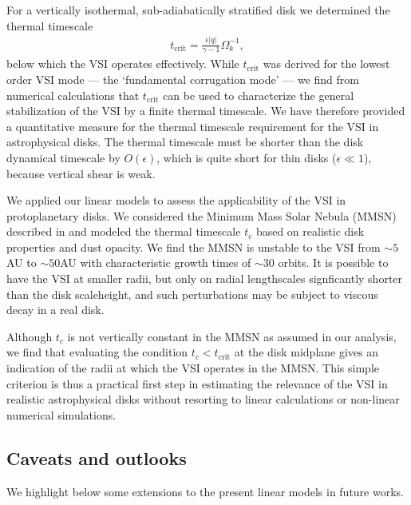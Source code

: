 For a vertically isothermal, sub-adiabatically stratified disk we
determined the thermal timescale   
\begin{align*}
  t_\mathrm{crit} = \frac{\epsilon |q|}{\gamma-1}\Omega_k^{-1}, 
\end{align*}
below which the VSI operates effectively. While $t_\mathrm{crit}$ was
derived for the lowest order VSI mode --- the `fundamental  
corrugation mode' --- we find from numerical calculations that
$t_\mathrm{crit}$ can be used to characterize the general
stabilization of the VSI by a finite thermal timescale. %
We have therefore provided a quantitative measure for the thermal
timescale requirement for the VSI in astrophysical 
disks. The thermal timescale must be shorter than the disk
dynamical timescale by $O(\epsilon)$, which is
quite short for thin disks ($\epsilon\ll 1$), because vertical shear is weak.    

We applied our linear models to assess the applicability of the VSI in
protoplanetary disks. We considered the Minimum Mass Solar Nebula 
(MMSN) described in \cite{chiang10} and   
modeled the thermal timescale $t_c$ based on realistic
disk properties and dust opacity. 
We find the MMSN is unstable to the VSI 
from $\sim 5$AU to $\sim50$AU with characteristic growth times of
$\sim 30$ orbits. It is possible to have the VSI at smaller
radii, but only on radial lengthscales signficantly shorter
than the disk scaleheight, and such perturbations may
be subject to viscous decay in a real disk.   

Although $t_c$ is not vertically constant in the 
MMSN as assumed in our analysis, we find that evaluating the condition
$t_c< t_\mathrm{crit}$ at the disk midplane gives an indication of the
radii at which the VSI operates in the MMSN. This simple criterion is
thus a practical first step in estimating the relevance of the VSI in
realistic astrophysical disks without resorting to linear
calculations or non-linear numerical simulations.   

\subsection{Caveats and outlooks} 
We highlight below some extensions to the present  
linear models in future works.  

